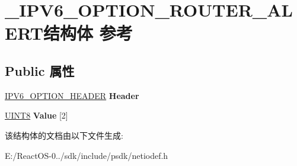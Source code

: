 \hypertarget{struct___i_p_v6___o_p_t_i_o_n___r_o_u_t_e_r___a_l_e_r_t}{}\section{\+\_\+\+I\+P\+V6\+\_\+\+O\+P\+T\+I\+O\+N\+\_\+\+R\+O\+U\+T\+E\+R\+\_\+\+A\+L\+E\+R\+T结构体 参考}
\label{struct___i_p_v6___o_p_t_i_o_n___r_o_u_t_e_r___a_l_e_r_t}
\subsection*{Public 属性}
\begin{DoxyCompactItemize}
\item 
\mbox{\label{struct___i_p_v6___o_p_t_i_o_n___r_o_u_t_e_r___a_l_e_r_t_a910d4f3123607006b1c6c873170647af}} 
\hyperlink{struct___i_p_v6___o_p_t_i_o_n___h_e_a_d_e_r}{I\+P\+V6\+\_\+\+O\+P\+T\+I\+O\+N\+\_\+\+H\+E\+A\+D\+ER} {\bfseries Header}
\item 
\mbox{\label{struct___i_p_v6___o_p_t_i_o_n___r_o_u_t_e_r___a_l_e_r_t_a8736f6668c81ed27f02ec88bbd82990a}} 
\hyperlink{_processor_bind_8h_ab27e9918b538ce9d8ca692479b375b6a}{U\+I\+N\+T8} {\bfseries Value} \mbox{[}2\mbox{]}
\end{DoxyCompactItemize}


该结构体的文档由以下文件生成\+:\begin{DoxyCompactItemize}
\item 
E\+:/\+React\+O\+S-\/0../sdk/include/psdk/netiodef.\+h\end{DoxyCompactItemize}
